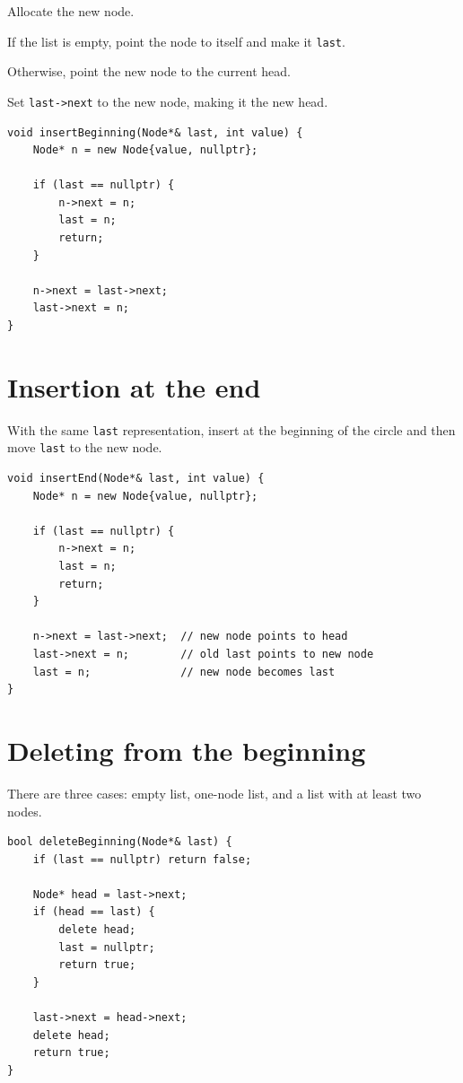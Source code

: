 \begin{mlsteps}
  \item Allocate the new node.
  \item If the list is empty, point the node to itself and make it \texttt{last}.
  \item Otherwise, point the new node to the current head.
  \item Set \texttt{last->next} to the new node, making it the new head.
\end{mlsteps}

\begin{lstlisting}
void insertBeginning(Node*& last, int value) {
    Node* n = new Node{value, nullptr};

    if (last == nullptr) {
        n->next = n;
        last = n;
        return;
    }

    n->next = last->next;
    last->next = n;
}
\end{lstlisting}

\section{Insertion at the end}

With the same \texttt{last} representation, insert at the beginning of the circle and then move \texttt{last} to the new node.

\begin{lstlisting}
void insertEnd(Node*& last, int value) {
    Node* n = new Node{value, nullptr};

    if (last == nullptr) {
        n->next = n;
        last = n;
        return;
    }

    n->next = last->next;  // new node points to head
    last->next = n;        // old last points to new node
    last = n;              // new node becomes last
}
\end{lstlisting}

\section{Deleting from the beginning}

There are three cases: empty list, one-node list, and a list with at least two nodes.

\begin{lstlisting}
bool deleteBeginning(Node*& last) {
    if (last == nullptr) return false;

    Node* head = last->next;
    if (head == last) {
        delete head;
        last = nullptr;
        return true;
    }

    last->next = head->next;
    delete head;
    return true;
}
\end{lstlisting}

